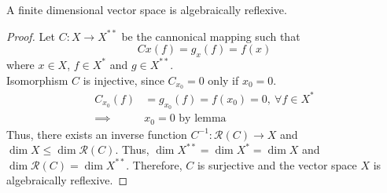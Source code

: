 \begin{theorem}
	A finite dimensional vector space is algebraically reflexive.
\end{theorem}
\begin{proof}
	Let $C : X \to X^{\ast\ast}$ be the cannonical mapping such that \[ Cx(f) = g_x(f) = f(x) \]
	where $x \in X$, $f \in X^\ast$ and $g \in X^{\ast\ast}$.\\

	Isomorphism $C$ is injective, since $C_{x_0} = 0$ only if $x_0 = 0$.
	\begin{align*}
		C_{x_0}(f) & = g_{x_0}(f) = f(x_0) = 0,\ \forall f \in X^\ast \\
		\implies & x_0 = 0 \text{ by lemma}
	\end{align*}
	Thus, there exists an inverse function $C^{-1} : \mathscr{R}(C) \to X$ and $\dim X \le \dim \mathscr{R}(C)$.
	Thus, $\dim X^{\ast\ast} = \dim X^\ast = \dim X$ and $\dim \mathscr{R}(C) = \dim X^{\ast\ast}$. 
	Therefore, $C$ is surjective and the vector space $X$ is algebraically reflexive.
\end{proof}

